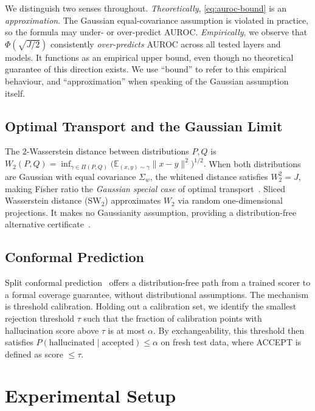 \documentclass[10pt,twocolumn]{article}
\newcommand{\FloatBarrier}{\clearpage}
\begin{document}
We distinguish two senses throughout.
\textit{Theoretically}, \eqref{eq:auroc-bound} is an \emph{approximation}.
The Gaussian equal-covariance assumption is violated in practice, so the
formula may under- or over-predict AUROC. \textit{Empirically}, we
observe that $\Phi(\sqrt{J/2})$ consistently \emph{over-predicts} AUROC
across all tested layers and models. It functions as an empirical upper
bound, even though no theoretical guarantee of this direction exists. We
use ``bound'' to refer to this empirical behaviour, and
``approximation'' when speaking of the Gaussian assumption itself.

\subsection{Optimal Transport and the Gaussian Limit}
\label{sec:background-ot}

The $2$-Wasserstein distance between distributions $P, Q$ is
$W_2(P, Q) = \inf_{\gamma \in \Pi(P,Q)} \bigl(\mathbb{E}_{(x,y)\sim\gamma}
\|x-y\|^2\bigr)^{1/2}.$
When both distributions are Gaussian with equal covariance $\Sigma_w$,
the whitened distance satisfies $W_2^2 = J$, making Fisher ratio the
\emph{Gaussian special case} of optimal transport~\citep{sugiyama2007}.
Sliced Wasserstein distance ($\text{SW}_2$) approximates $W_2$ via random
one-dimensional projections. It makes no Gaussianity assumption,
providing a distribution-free alternative certificate~\citep{kolouri2019}.

\subsection{Conformal Prediction}
\label{sec:background-conformal}

Split conformal prediction~\citep{angelopoulos2022} offers a
distribution-free path from a trained scorer to a formal coverage
guarantee, without distributional assumptions. The mechanism is
threshold calibration. Holding out a calibration set, we identify the
smallest rejection threshold $\tau$ such that the fraction of
calibration points with hallucination score above $\tau$ is at most
$\alpha$. By exchangeability, this threshold then satisfies
$P(\text{hallucinated} \mid \text{accepted}) \leq \alpha$ on fresh test
data, where ACCEPT is defined as score $\leq \tau$.

\FloatBarrier
\section{Experimental Setup}
\label{sec:setup}
\end{document}
